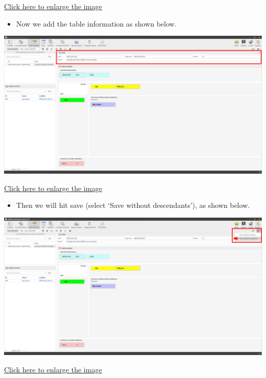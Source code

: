 \documentclass[
]{book}
\providecommand{\tightlist}{%
  \setlength{\itemsep}{0pt}\setlength{\parskip}{0pt}}
\begin{document}
\href{images/image140.png}{Click here to enlarge the image}

\begin{itemize}
\tightlist
\item
  Now we add the table information as shown below.
\end{itemize}

\begin{center}\includegraphics[width=1\linewidth]{./images/image142} \end{center}

\href{images/image142.png}{Click here to enlarge the image}

\begin{itemize}
\tightlist
\item
  Then we will hit save (select `Save without descendants'), as shown below.
\end{itemize}

\begin{center}\includegraphics[width=1\linewidth]{./images/image144} \end{center}

\href{images/image144.png}{Click here to enlarge the image}
\end{document}
